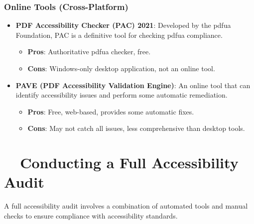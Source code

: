 \subsubsection{Online Tools (Cross-Platform)}
\label{ssubsec:online-tools-pdf}
\begin{itemize}
	\item \textbf{PDF Accessibility Checker (PAC) 2021}: Developed by the \gls{pdfua} Foundation, PAC is a definitive tool for checking \gls{pdfua} compliance.
	      \begin{itemize}
		      \item \textbf{Pros}: Authoritative \gls{pdfua} checker, free.
		      \item \textbf{Cons}: Windows-only desktop application, not an online tool.
	      \end{itemize}
	\item \textbf{PAVE (PDF Accessibility Validation Engine)}: An online tool that can identify accessibility issues and perform some automatic remediation.
	      \begin{itemize}
		      \item \textbf{Pros}: Free, web-based, provides some automatic fixes.
		      \item \textbf{Cons}: May not catch all issues, less comprehensive than desktop tools.
	      \end{itemize}
\end{itemize}

\section{~~Conducting a Full Accessibility Audit}
\label{sec:full-accessibility-audit}
A full accessibility audit involves a combination of automated tools and manual checks to ensure compliance with accessibility standards.

